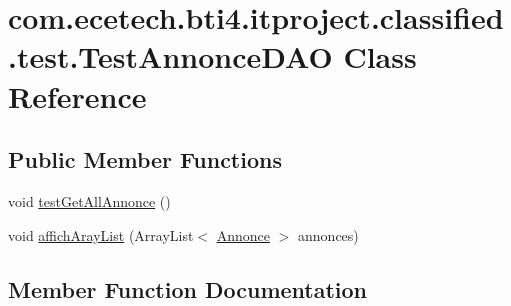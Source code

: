 \hypertarget{classcom_1_1ecetech_1_1bti4_1_1itproject_1_1classified_1_1test_1_1_test_annonce_d_a_o}{}\section{com.\+ecetech.\+bti4.\+itproject.\+classified.\+test.\+Test\+Annonce\+D\+AO Class Reference}
\label{classcom_1_1ecetech_1_1bti4_1_1itproject_1_1classified_1_1test_1_1_test_annonce_d_a_o}
\subsection*{Public Member Functions}
\begin{DoxyCompactItemize}
\item 
void \hyperlink{classcom_1_1ecetech_1_1bti4_1_1itproject_1_1classified_1_1test_1_1_test_annonce_d_a_o_a79c5f3c3dbe6e53f483e7bf72943feea}{test\+Get\+All\+Annonce} ()
\item 
void \hyperlink{classcom_1_1ecetech_1_1bti4_1_1itproject_1_1classified_1_1test_1_1_test_annonce_d_a_o_abd28cc3c6c24bf4158d31633261df7ae}{affich\+Aray\+List} (Array\+List$<$ \hyperlink{classcom_1_1ecetech_1_1bti4_1_1itproject_1_1classified_1_1beans_1_1_annonce}{Annonce} $>$ annonces)
\end{DoxyCompactItemize}


\subsection{Member Function Documentation}

